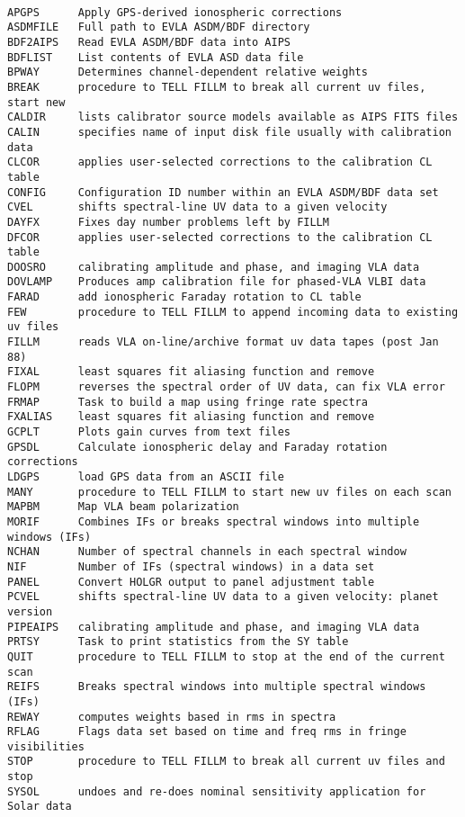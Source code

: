 \vskip 0.5pt
\bbve\begin{verbatim}

APGPS      Apply GPS-derived ionospheric corrections
ASDMFILE   Full path to EVLA ASDM/BDF directory
BDF2AIPS   Read EVLA ASDM/BDF data into AIPS
BDFLIST    List contents of EVLA ASD data file
BPWAY      Determines channel-dependent relative weights
BREAK      procedure to TELL FILLM to break all current uv files, start new
CALDIR     lists calibrator source models available as AIPS FITS files
CALIN      specifies name of input disk file usually with calibration data
CLCOR      applies user-selected corrections to the calibration CL table
CONFIG     Configuration ID number within an EVLA ASDM/BDF data set
CVEL       shifts spectral-line UV data to a given velocity
DAYFX      Fixes day number problems left by FILLM
DFCOR      applies user-selected corrections to the calibration CL table
DOOSRO     calibrating amplitude and phase, and imaging VLA data
DOVLAMP    Produces amp calibration file for phased-VLA VLBI data
FARAD      add ionospheric Faraday rotation to CL table
FEW        procedure to TELL FILLM to append incoming data to existing uv files
FILLM      reads VLA on-line/archive format uv data tapes (post Jan 88)
FIXAL      least squares fit aliasing function and remove
FLOPM      reverses the spectral order of UV data, can fix VLA error
FRMAP      Task to build a map using fringe rate spectra
FXALIAS    least squares fit aliasing function and remove
GCPLT      Plots gain curves from text files
GPSDL      Calculate ionospheric delay and Faraday rotation corrections
LDGPS      load GPS data from an ASCII file
MANY       procedure to TELL FILLM to start new uv files on each scan
MAPBM      Map VLA beam polarization
MORIF      Combines IFs or breaks spectral windows into multiple windows (IFs)
NCHAN      Number of spectral channels in each spectral window
NIF        Number of IFs (spectral windows) in a data set
PANEL      Convert HOLGR output to panel adjustment table
PCVEL      shifts spectral-line UV data to a given velocity: planet version
PIPEAIPS   calibrating amplitude and phase, and imaging VLA data
PRTSY      Task to print statistics from the SY table
QUIT       procedure to TELL FILLM to stop at the end of the current scan
REIFS      Breaks spectral windows into multiple spectral windows (IFs)
REWAY      computes weights based in rms in spectra
RFLAG      Flags data set based on time and freq rms in fringe visibilities
STOP       procedure to TELL FILLM to break all current uv files and stop
SYSOL      undoes and re-does nominal sensitivity application for Solar data

\end{verbatim}

